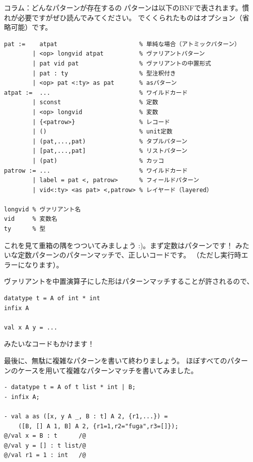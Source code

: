 \documentclass[11pt,a4paper]{jarticle}
\begin{document}
\begin{itembox}[l]{コラム：どんなパターンが存在するの}
  パターンは以下のBNFで表されます。慣れが必要ですがぜひ読んでみてください。
  \prog{<>}でくくられたものはオプション（省略可能）です。
\begin{Verbatim}
pat :=    atpat                       % 単純な場合（アトミックパターン）
        | <op> longvid atpat          % ヴァリアントパターン
        | pat vid pat                 % ヴァリアントの中置形式
        | pat : ty                    % 型注釈付き
        | <op> pat <:ty> as pat       % asパターン
atpat :=  ...                         % ワイルドカード
        | sconst                      % 定数
        | <op> longvid                % 変数
        | {<patrow>}                  % レコード
        | ()                          % unit定数
        | (pat,...,pat)               % タプルパターン
        | [pat,...,pat]               % リストパターン
        | (pat)                       % カッコ
patrow := ...                         % ワイルドカード
        | label = pat <, patrow>      % フィールドパターン
        | vid<:ty> <as pat> <,patrow> % レイヤード（layered）

longvid % ヴァリアント名
vid     % 変数名
ty      % 型
\end{Verbatim}

これを見て重箱の隅をつついてみましょう :)。まず定数はパターンです！
みたいな定数パターンのパターンマッチで、正しいコードです。
（ただし実行時エラーになります）。

ヴァリアントを中置演算子にした形はパターンマッチすることが許されるので、
\begin{lstlisting}[caption=中置形式のヴァリアントのパターンマッチ]
datatype t = A of int * int
infix A

val x A y = ...
\end{lstlisting}
みたいなコードもかけます！

最後に、無駄に複雑なパターンを書いて終わりましょう。
ほぼすべてのパターンのケースを用いて複雑なパターンマッチを書いてみました。
\begin{lstlisting}[caption=複雑なパターン]
- datatype t = A of t list * int | B;
- infix A;

- val a as ([x, y A _, B : t] A 2, {r1,...}) =
    ([B, [] A 1, B] A 2, {r1=1,r2="fuga",r3=[]});
@/val x = B : t      /@
@/val y = [] : t list/@
@/val r1 = 1 : int   /@

\end{lstlisting}
\end{itembox}
\end{document}
